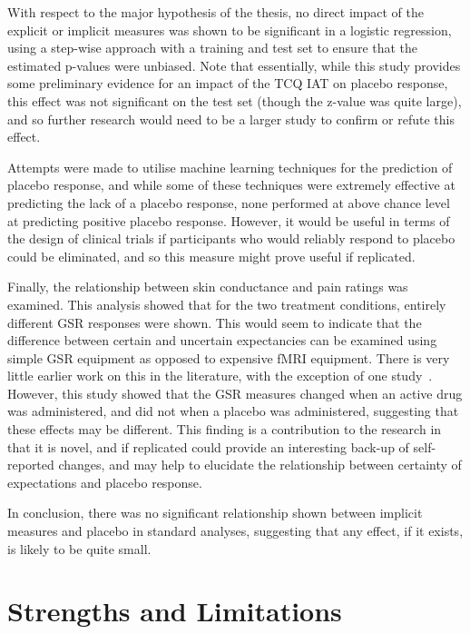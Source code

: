 With respect to the major hypothesis of the thesis, no direct impact
of the explicit or implicit measures was shown to be significant in a
logistic regression, using a step-wise approach with a training and
test set to ensure that the estimated p-values were unbiased. Note
that essentially, while this study provides some preliminary evidence
for an impact of the TCQ IAT on placebo response, this effect was not
significant on the test set (though the z-value was quite large), and
so further research would need to be a larger study to confirm or
refute this effect.

Attempts were
made to utilise machine learning techniques for the prediction of
placebo response, and while some of these techniques were extremely
effective at predicting the lack of a placebo response, none performed
at above chance level at predicting positive placebo response.
However, it would be useful in terms of the design of clinical trials
if participants who would reliably respond to placebo could be
eliminated, and so this measure might prove useful if replicated.

Finally, the relationship between skin conductance and pain ratings
was examined. This analysis showed that for the two treatment
conditions, entirely different GSR responses were shown. This would
seem to indicate that the difference between certain and uncertain
expectancies can be examined using simple GSR equipment as opposed to
expensive fMRI equipment. There is very little earlier work on this in the literature, with the exception of one study~\cite{Fujita2000}. However, this study showed that the GSR measures changed when an active drug was administered, and did not when a placebo was administered, suggesting that these effects may be different. This finding is a contribution to the research in that it is novel, and if replicated could provide an interesting back-up of self-reported changes, and may help to elucidate the relationship between certainty of expectations and placebo response. 

In conclusion, there was no significant relationship shown between
implicit measures and placebo in standard analyses, suggesting that
any effect, if it exists, is likely to be quite small.

\section{Strengths and Limitations}
\label{sec:strengths-limit}

